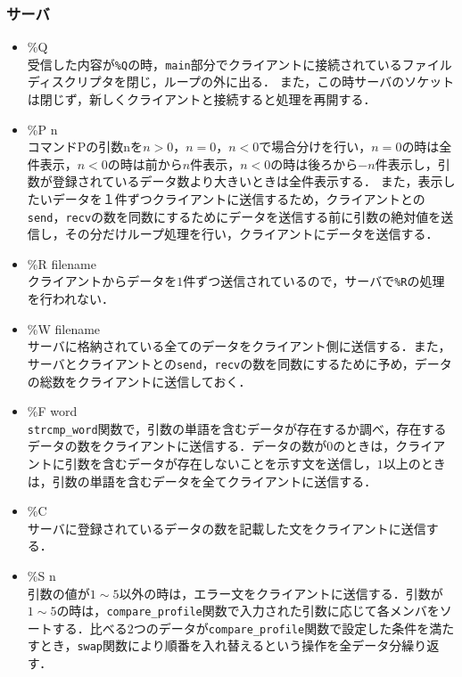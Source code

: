 \documentclass{jarticle}[11pt]
\begin{document}
\subsubsection{サーバ}
\begin{itemize}
\item \%Q \\
受信した内容が\verb|%Q|の時，\verb|main|部分でクライアントに接続されているファイルディスクリプタを閉じ，ループの外に出る．
また，この時サーバのソケットは閉じず，新しくクライアントと接続すると処理を再開する．

\item \%P n\\
コマンドPの引数nを$n>0，n=0，n<0$で場合分けを行い，$n=0$の時は全件表示，$n<0$の時は前から$n$件表示，$n<0$の時は後ろから$-n$件表示し，引数が登録されているデータ数より大きいときは全件表示する．
  また，表示したいデータを$１$件ずつクライアントに送信するため，クライアントとの\verb|send|，\verb|recv|の数を同数にするためにデータを送信する前に引数の絶対値を送信し，その分だけループ処理を行い，クライアントにデータを送信する．

\item \%R filename\\
クライアントからデータを$1$件ずつ送信されているので，サーバで\verb|%R|の処理を行われない．

\item \%W filename\\
サーバに格納されている全てのデータをクライアント側に送信する．また，サーバとクライアントとの\verb|send|，\verb|recv|の数を同数にするために予め，データの総数をクライアントに送信しておく．

\item \%F word\\
\verb|strcmp_word|関数で，引数の単語を含むデータが存在するか調べ，存在するデータの数をクライアントに送信する．データの数が$0$のときは，クライアントに引数を含むデータが存在しないことを示す文を送信し，$1$以上のときは，引数の単語を含むデータを全てクライアントに送信する．

\item \%C \\
サーバに登録されているデータの数を記載した文をクライアントに送信する．

\item \%S n\\
引数の値が$1\sim5$以外の時は，エラー文をクライアントに送信する．引数が$1\sim5$の時は，\verb|compare_profile|関数で入力された引数に応じて各メンバをソートする．比べる$2$つのデータが\verb|compare_profile|関数で設定した条件を満たすとき，\verb|swap|関数により順番を入れ替えるという操作を全データ分繰り返す．


\end{itemize}
\end{document}

